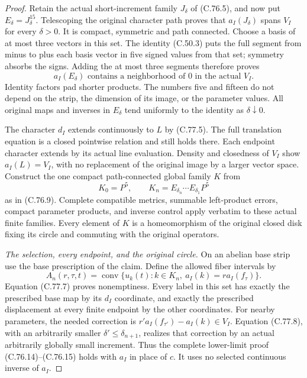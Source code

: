 \begin{proof}
Retain the actual short-increment family $J_\delta$
of (C.76.5), and now put $E_\delta=J_\delta^{15}$.
Telescoping the original character path proves that
$a_I(J_\delta)$ spans $V_I$ for every $\delta>0$.
It is compact, symmetric and path connected.
Choose a basis of at most three vectors in this set.
The identity (C.50.3) puts the full segment from minus
to plus each basis vector in five signed values from
that set; symmetry absorbs the signs. Adding the at
most three segments therefore proves
\[
      a_I(E_\delta)\text{ contains a neighborhood of }0
                         \text{ in the actual }V_I.
                                                               \tag{C.77.8}
\]
Identity factors pad shorter products. The numbers
five and fifteen do not depend on the strip, the
dimension of its image, or the parameter values.
All original maps and inverses in $E_\delta$ tend
uniformly to the identity as $\delta\downarrow0$.

The character $d_I$ extends continuously to $L$ by
(C.77.5). The full translation equation is a closed
pointwise relation and still holds there. Each endpoint
character extends by its actual line evaluation.
Density and closedness of $V_I$ show $a_I(L)=V_I$,
with no replacement of the original image by a larger
vector space. Construct the one compact path-connected
global family $K$ from
\[
           K_0=P^5,\qquad
           K_n=E_{\delta_n}\cdots E_{\delta_1}P^5
                                                               \tag{C.77.9}
\]
as in (C.76.9). Complete compatible metrics, summable
left-product errors, compact parameter products, and
inverse control apply verbatim to these actual finite
families. Every element of $K$ is a homeomorphism of
the original closed disk fixing its circle and commuting
with the original operators.

\emph{The selection, every endpoint, and the original circle.}
On an abelian base strip use the base prescription
of the claim. Define the allowed fiber intervals by
\[
 A_n(r,\tau,t)=\operatorname{conv}
 \{u_k(t): k\in K_n,\ a_I(k)=r a_I(f_\tau)\}.
                                                               \tag{C.77.10}
\]
Equation (C.77.7) proves nonemptiness. Every label in
this set has exactly the prescribed base map by its
$d_I$ coordinate, and exactly the prescribed displacement
at every finite endpoint by the other coordinates.
For nearby parameters, the needed correction is
$r'a_I(f_{\tau'})-a_I(k)\in V_I$.
Equation (C.77.8), with an arbitrarily smaller
$\delta'\leq\delta_{n+1}$, realizes that correction
by an actual arbitrarily globally small increment.
Thus the complete lower-limit proof (C.76.14)--(C.76.15)
holds with $a_I$ in place of $c$. It uses no selected
continuous inverse of $a_I$.


\end{proof}
